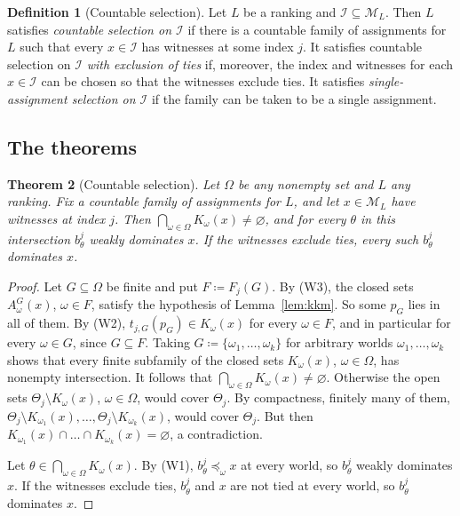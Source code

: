 \documentclass[11pt]{article}
\newtheorem{theorem}{Theorem}[section]
\theoremstyle{definition}
\newtheorem{definition}[theorem]{Definition}
\theoremstyle{remark}
\newcommand{\M}{\mathcal M}
\newcommand{\I}{\mathcal I}
\begin{document}
\begin{definition}[Countable selection]\label{def:selection}
Let $L$ be a ranking and $\I\subseteq\M_L$. Then $L$ satisfies \emph{countable selection on $\I$} if there is a countable family of assignments for $L$ such that every $x\in\I$ has witnesses at some index $j$. It satisfies countable selection on $\I$ \emph{with exclusion of ties} if, moreover, the index and witnesses for each $x\in\I$ can be chosen so that the witnesses exclude ties. It satisfies \emph{single-assignment selection on $\I$} if the family can be taken to be a single assignment.
\end{definition}

\subsection{The theorems}

\begin{theorem}[Countable selection]\label{thm:general}
Let $\Omega$ be any nonempty set and $L$ any ranking. Fix a countable family of assignments for $L$, and let $x\in\M_L$ have witnesses at index $j$. Then $\bigcap_{\omega\in\Omega}K_\omega(x)\ne\varnothing$, and for every $\theta$ in this intersection $b^j_\theta$ weakly dominates $x$. If the witnesses exclude ties, every such $b^j_\theta$ dominates $x$.
\end{theorem}
\begin{proof}
Let $G\subseteq\Omega$ be finite and put $F\coloneqq F_j(G)$. By (W3), the closed sets $A^G_\omega(x)$, $\omega\in F$, satisfy the hypothesis of Lemma~\ref{lem:kkm}. So some $p_G$ lies in all of them. By (W2), $t_{j,G}(p_G)\in K_\omega(x)$ for every $\omega\in F$, and in particular for every $\omega\in G$, since $G\subseteq F$. Taking $G\coloneqq\{\omega_1,\dots,\omega_k\}$ for arbitrary worlds $\omega_1,\dots,\omega_k$ shows that every finite subfamily of the closed sets $K_\omega(x)$, $\omega\in\Omega$, has nonempty intersection. It follows that $\bigcap_{\omega\in\Omega}K_\omega(x)\ne\varnothing$. Otherwise the open sets $\Theta_j\setminus K_\omega(x)$, $\omega\in\Omega$, would cover $\Theta_j$. By compactness, finitely many of them, $\Theta_j\setminus K_{\omega_1}(x),\dots,\Theta_j\setminus K_{\omega_k}(x)$, would cover $\Theta_j$. But then $K_{\omega_1}(x)\cap\dots\cap K_{\omega_k}(x)=\varnothing$, a contradiction.

Let $\theta\in\bigcap_{\omega\in\Omega}K_\omega(x)$. By (W1), $b^j_\theta\preceq_\omega x$ at every world, so $b^j_\theta$ weakly dominates $x$. If the witnesses exclude ties, $b^j_\theta$ and $x$ are not tied at every world, so $b^j_\theta$ dominates $x$.
\end{proof}
\end{document}

